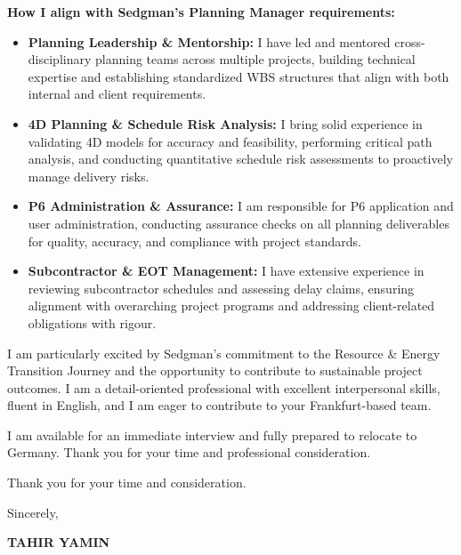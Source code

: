 \documentclass[11pt,a4paper]{article}
\begin{document}
\textbf{How I align with Sedgman's Planning Manager requirements:}
\begin{itemize}
    \item \textbf{Planning Leadership \& Mentorship:} I have led and mentored cross-disciplinary planning teams across multiple projects, building technical expertise and establishing standardized WBS structures that align with both internal and client requirements.
    \item \textbf{4D Planning \& Schedule Risk Analysis:} I bring solid experience in validating 4D models for accuracy and feasibility, performing critical path analysis, and conducting quantitative schedule risk assessments to proactively manage delivery risks.
    \item \textbf{P6 Administration \& Assurance:} I am responsible for P6 application and user administration, conducting assurance checks on all planning deliverables for quality, accuracy, and compliance with project standards.
    \item \textbf{Subcontractor \& EOT Management:} I have extensive experience in reviewing subcontractor schedules and assessing delay claims, ensuring alignment with overarching project programs and addressing client-related obligations with rigour.
\end{itemize}

I am particularly excited by Sedgman's commitment to the Resource \& Energy Transition Journey and the opportunity to contribute to sustainable project outcomes. I am a detail-oriented professional with excellent interpersonal skills, fluent in English, and I am eager to contribute to your Frankfurt-based team.

I am available for an immediate interview and fully prepared to relocate to Germany. Thank you for your time and professional consideration.

Thank you for your time and consideration.

\vspace{0.5cm}
Sincerely,

\vspace{0.5cm}
\textbf{TAHIR YAMIN}
\end{document}
